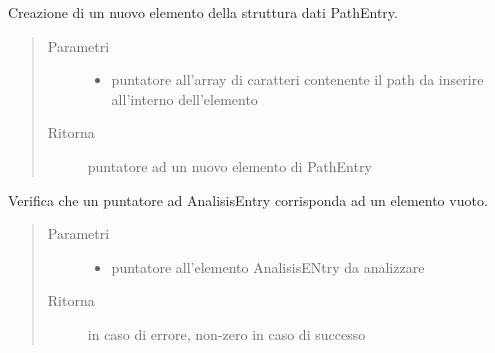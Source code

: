 \documentclass[letterpaper,10pt,italian,openany,oneside]{sphinxmanual}
\begin{document}
\begin{fulllineitems}
\label{\detokenize{code/datastructure:c.createNewPath}}
Creazione di un nuovo elemento della struttura dati PathEntry.
\begin{quote}\begin{description}
\item[{Parametri}] \leavevmode\begin{itemize}
\item {} 
 \textendash{} puntatore all’array di caratteri contenente il path da inserire all’interno dell’elemento

\end{itemize}

\item[{Ritorna}] \leavevmode
puntatore ad un nuovo elemento di PathEntry

\end{description}\end{quote}

\end{fulllineitems}


\begin{fulllineitems}
\label{\detokenize{code/datastructure:c.isAnalisisEmpty}}
Verifica che un puntatore ad AnalisisEntry corrisponda ad un elemento vuoto.
\begin{quote}\begin{description}
\item[{Parametri}] \leavevmode\begin{itemize}
\item {} 
 \textendash{} puntatore all’elemento AnalisisENtry da analizzare

\end{itemize}

\item[{Ritorna}]  in caso di errore, non-zero in caso di successo

\end{description}\end{quote}

\end{fulllineitems}
\end{document}

